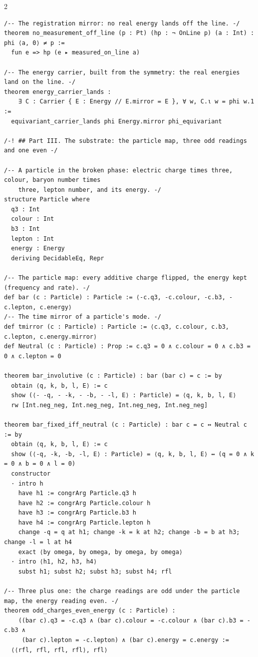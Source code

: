 \documentclass[10pt]{article}
\begin{document}
\begin{multicols}{2}
\begin{Verbatim}[fontsize=\fontsize{6.2}{7.2}\selectfont,breaklines,breakanywhere,breaksymbolleft={}]
/-- The registration mirror: no real energy lands off the line. -/
theorem no_measurement_off_line (p : Pt) (hp : ¬ OnLine p) (a : Int) : phi ⟨a, 0⟩ ≠ p :=
  fun e => hp (e ▸ measured_on_line a)

/-- The energy carrier, built from the symmetry: the real energies land on the line. -/
theorem energy_carrier_lands :
    ∃ C : Carrier { E : Energy // E.mirror = E }, ∀ w, C.ι w = phi w.1 :=
  equivariant_carrier_lands phi Energy.mirror phi_equivariant

/-! ## Part III. The substrate: the particle map, three odd readings and one even -/

/-- A particle in the broken phase: electric charge times three, colour, baryon number times
    three, lepton number, and its energy. -/
structure Particle where
  q3 : Int
  colour : Int
  b3 : Int
  lepton : Int
  energy : Energy
  deriving DecidableEq, Repr

/-- The particle map: every additive charge flipped, the energy kept (frequency and rate). -/
def bar (c : Particle) : Particle := ⟨-c.q3, -c.colour, -c.b3, -c.lepton, c.energy⟩
/-- The time mirror of a particle's mode. -/
def tmirror (c : Particle) : Particle := ⟨c.q3, c.colour, c.b3, c.lepton, c.energy.mirror⟩
def Neutral (c : Particle) : Prop := c.q3 = 0 ∧ c.colour = 0 ∧ c.b3 = 0 ∧ c.lepton = 0

theorem bar_involutive (c : Particle) : bar (bar c) = c := by
  obtain ⟨q, k, b, l, E⟩ := c
  show (⟨- -q, - -k, - -b, - -l, E⟩ : Particle) = ⟨q, k, b, l, E⟩
  rw [Int.neg_neg, Int.neg_neg, Int.neg_neg, Int.neg_neg]

theorem bar_fixed_iff_neutral (c : Particle) : bar c = c ↔ Neutral c := by
  obtain ⟨q, k, b, l, E⟩ := c
  show (⟨-q, -k, -b, -l, E⟩ : Particle) = ⟨q, k, b, l, E⟩ ↔ (q = 0 ∧ k = 0 ∧ b = 0 ∧ l = 0)
  constructor
  · intro h
    have h1 := congrArg Particle.q3 h
    have h2 := congrArg Particle.colour h
    have h3 := congrArg Particle.b3 h
    have h4 := congrArg Particle.lepton h
    change -q = q at h1; change -k = k at h2; change -b = b at h3; change -l = l at h4
    exact ⟨by omega, by omega, by omega, by omega⟩
  · intro ⟨h1, h2, h3, h4⟩
    subst h1; subst h2; subst h3; subst h4; rfl

/-- Three plus one: the charge readings are odd under the particle map, the energy reading even. -/
theorem odd_charges_even_energy (c : Particle) :
    ((bar c).q3 = -c.q3 ∧ (bar c).colour = -c.colour ∧ (bar c).b3 = -c.b3 ∧
     (bar c).lepton = -c.lepton) ∧ (bar c).energy = c.energy :=
  ⟨⟨rfl, rfl, rfl, rfl⟩, rfl⟩


\end{Verbatim}
\end{multicols}
\end{document}
